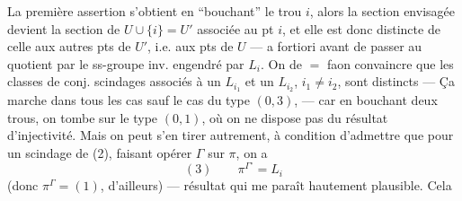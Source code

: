 La première assertion s'obtient en ``bouchant''
le trou $i$, alors la section envisagée devient
la section de $U\cup\{i\}=U'$ associée au pt $i$,
et elle est donc distincte de celle 
aux  autres pts de $U'$, i.e. aux pts de
$U$ --- a fortiori avant de passer au
quotient par le ss-groupe inv. engendré
par $L_i$. On  de $=$ faon 
convaincre que les classes de conj. 
scindages associés à un $L_{i_1}$ et un $L_{i_2}$, $i_1\ne i_2$,
sont distincts --- Ça marche dans tous les
cas sauf le cas du type $(0,3)$, ---
car en bouchant deux trous, on tombe
sur le type $(0,1)$, où on ne dispose pas
du résultat d'injectivité. Mais on
peut s'en tirer autrement, à condition
d'admettre que pour un scindage de
(2), faisant opérer $\Gamma$ sur $\pi$, on a
\[
(3)\qquad\pi^{\Gamma^\circ}=L_i
\]
(donc $\pi^\Gamma=(1)$, d'ailleurs) --- résultat
qui me paraît hautement plausible. Cela

